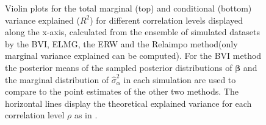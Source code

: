 \begin{figure}[H]
  \centering
  \hfill
  \caption[Marginal and conditional $R^2$ in Gaussian LMM]{Violin plots for the total marginal (top) and conditional (bottom) variance explained ($R^2$) for different correlation levels displayed along the x-axis, calculated from the ensemble of simulated datasets by the BVI, ELMG, the ERW and the Relaimpo method(only marginal variance explained can be computed). For the BVI method the posterior means of the sampled posterior distributions of $\boldsymbol{\beta}$ and the marginal distribution of $\hat{\sigma}^2_{\alpha}$ in each simulation are used to compare to the point estimates of the other two methods. The horizontal lines display the theoretical explained variance for each correlation level $\rho$ as in .}
  \label{fig:total_variance}
\end{figure}

